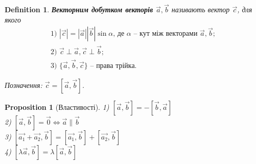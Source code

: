 \documentclass[a4paper, 10pt]{extarticle}
\theoremstyle{theoremdd}
\theoremstyle{theoremdd}
\newtheorem{definition}[theorem]{Definition}
\theoremstyle{theoremdd}
\theoremstyle{theoremdd}
\theoremstyle{theoremdd}
\newtheorem{proposition}[theorem]{Proposition}
\theoremstyle{theoremdd}
\theoremstyle{theoremdd}
\theoremstyle{theoremdd}
\begin{document}
\begin{definition}
	\textbf{Векторним добутком векторів $\vec{a}, \vec{b}$} називають вектор $\vec{c}$, для якого
	\begin{align*}
	\text{1) } |\vec{c}| = |\vec{a}| |\vec{b}| \sin \alpha \text{, де $\alpha$ -- кут між векторами $\vec{a},\vec{b}$}; \\
	\text{2) }  \vec{c} \perp \vec{a}, \vec{c} \perp \vec{b}; \\
	\text{3) } \{\vec{a}, \vec{b}, \vec{c}\} \text{ -- права трійка}.
	\end{align*}
\begin{figure}[H]
\centering
{}
\end{figure}
Позначення: $\vec{c} = [\vec{a}, \vec{b}]$.
\end{definition}

\begin{proposition}[Властивості]
1) $[\vec{a}, \vec{b}] = -[\vec{b}, \vec{a}]$\\
2) $[\vec{a}, \vec{b}] = \vec{0} \iff \vec{a} \parallel \vec{b}$\\
3) $[\vec{a_1} + \vec{a_2}, \vec{b}] = [\vec{a_1}, \vec{b}] + [\vec{a_2}, \vec{b}]$\\
4) $[\lambda \vec{a}, \vec{b}] = \lambda [\vec{a}, \vec{b}]$
\end{proposition}
\end{document}

